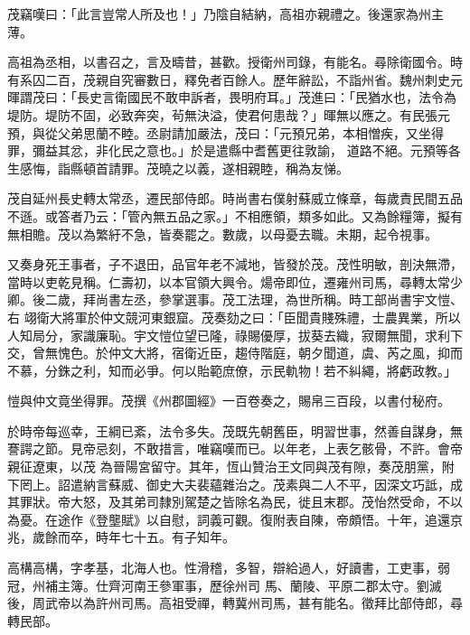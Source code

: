 \begin{pinyinscope}
 茂竊嘆曰：「此言豈常人所及也！」乃陰自結納，高祖亦親禮之。後還家為州主薄。



 高祖為丞相，以書召之，言及疇昔，甚歡。授衛州司錄，有能名。尋除衛國令。時有系囚二百，茂親自究審數日，釋免者百餘人。歷年辭訟，不詣州省。魏州刺史元暉謂茂曰：「長史言衛國民不敢申訴者，畏明府耳。」茂進曰：「民猶水也，法令為堤防。堤防不固，必致奔突，茍無決溢，使君何患哉？」暉無以應之。有民張元預，與從父弟思蘭不睦。丞尉請加嚴法，茂曰：「元預兄弟，本相憎疾，又坐得罪，彌益其忿，非化民之意也。」於是遣縣中耆舊更往敦諭，
 道路不絕。元預等各生感悔，詣縣頓首請罪。茂曉之以義，遂相親睦，稱為友悌。



 茂自延州長史轉太常丞，遷民部侍郎。時尚書右僕射蘇威立條章，每歲責民間五品不遜。或答者乃云：「管內無五品之家。」不相應領，類多如此。又為餘糧簿，擬有無相贍。茂以為繁紆不急，皆奏罷之。數歲，以母憂去職。未期，起令視事。



 又奏身死王事者，子不退田，品官年老不減地，皆發於茂。茂性明敏，剖決無滯，當時以吏乾見稱。仁壽初，以本官領大興令。煬帝即位，遷雍州司馬，尋轉太常少卿。後二歲，拜尚書左丞，參掌選事。茂工法理，為世所稱。時工部尚書宇文愷、右
 翊衛大將軍於仲文競河東銀窟。茂奏劾之曰：「臣聞貴賤殊禮，士農異業，所以人知局分，家識廉恥。宇文愷位望已隆，祿賜優厚，拔葵去織，寂爾無聞，求利下交，曾無愧色。於仲文大將，宿衛近臣，趨侍階庭，朝夕聞道，虞、芮之風，抑而不慕，分銖之利，知而必爭。何以貽範庶僚，示民軌物！若不糾繩，將虧政教。」



 愷與仲文竟坐得罪。茂撰《州郡圖經》一百卷奏之，賜帛三百段，以書付秘府。



 於時帝每巡幸，王綱已紊，法令多失。茂既先朝舊臣，明習世事，然善自謀身，無謇諤之節。見帝忌刻，不敢措言，唯竊嘆而已。以年老，上表乞骸骨，不許。會帝親征遼東，以茂
 為晉陽宮留守。其年，恆山贊治王文同與茂有隙，奏茂朋黨，附下罔上。詔遣納言蘇威、御史大夫裴蘊雜治之。茂素與二人不平，因深文巧詆，成其罪狀。帝大怒，及其弟司隸別駕楚之皆除名為民，徙且末郡。茂怡然受命，不以為憂。在途作《登壟賦》以自慰，詞義可觀。復附表自陳，帝頗悟。十年，追還京兆，歲餘而卒，時年七十五。有子知年。



 高構高構，字孝基，北海人也。性滑稽，多智，辯給過人，好讀書，工吏事，弱冠，州補主簿。仕齊河南王參軍事，歷徐州司
 馬、蘭陵、平原二郡太守。劉滅後，周武帝以為許州司馬。高祖受禪，轉冀州司馬，甚有能名。徵拜比部侍郎，尋轉民部。




\end{pinyinscope}

